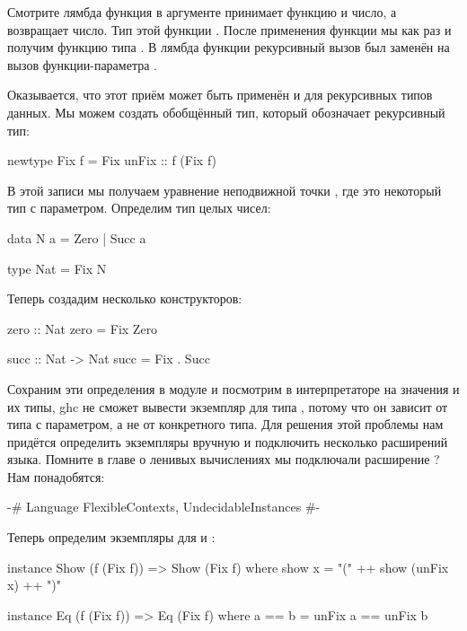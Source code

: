 Смотрите лямбда функция в аргументе  
принимает функцию и число, а возвращает число.
Тип этой функции .
После применения функции  мы как раз и получим
функцию типа . В лямбда функции рекурсивный
вызов был заменён на вызов функции-параметра . 

Оказывается, что этот приём может быть применён и 
для рекурсивных типов данных. Мы можем создать 
обобщённый тип, который обозначает рекурсивный тип:

\begin{code}
newtype Fix f = Fix { unFix :: f (Fix f) }
\end{code}

В этой записи мы получаем уравнение неподвижной точки 
, где  это некоторый тип с 
параметром. Определим тип целых чисел:

\begin{code}
data N a = Zero | Succ a

type Nat = Fix N
\end{code}

Теперь создадим несколько конструкторов:

\begin{code}
zero :: Nat
zero = Fix Zero

succ :: Nat -> Nat
succ = Fix . Succ
\end{code}

Сохраним эти определения в модуле  и 
посмотрим в интерпретаторе на значения и их типы,
ghc не сможет вывести экземпляр  для типа
, потому что он зависит от типа с параметром,
а не от конкретного типа. Для решения этой проблемы
нам придётся определить экземпляры вручную и
подключить несколько расширений языка.
Помните в главе о ленивых вычислениях мы 
подключали расширение ? 
Нам понадобятся:

\begin{code}
{-# Language FlexibleContexts, UndecidableInstances #-}
\end{code}

Теперь определим экземпляры для  и :

\begin{code}
instance Show (f (Fix f)) => Show (Fix f) where
    show x = "(" ++ show (unFix x) ++ ")"

instance Eq (f (Fix f)) => Eq (Fix f) where
    a == b = unFix a == unFix b
\end{code}

